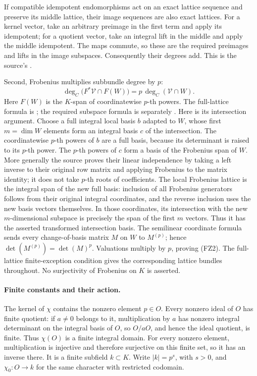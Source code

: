 If compatible idempotent endomorphisms act on an exact
lattice sequence and preserve its middle lattice, their
image sequences are also exact lattices.
For a kernel vector, take an arbitrary preimage in the
first term and apply its idempotent; for a quotient
vector, take an integral lift in the middle and apply
the middle idempotent.
The maps commute, so these are the required preimages
and lifts in the image subspaces.
Consequently their degrees add.
This is the source's
.

Second, Frobenius multiplies subbundle degree by \(p\):
\[
       \deg_C\bigl(F^*\mathcal V\cap F(W)\bigr)
                               =p\,\deg_C(\mathcal V\cap W).
 \tag{FZ2}\label{eq:faithful-frob-subdegree}
\]
Here \(F(W)\) is the \(K\)-span of coordinatewise
\(p\)-th powers.
The full-lattice formula is
; the required
subspace formula is separately
.
Here is its intersection argument.
Choose a full integral local basis \(b\) adapted to \(W\),
whose first \(m=\dim W\) elements form an integral
basis \(c\) of the intersection.
The coordinatewise \(p\)-th powers of \(b\) are a full
basis, because its determinant is raised to its
\(p\)-th power.
The \(p\)-th powers of \(c\) form a basis of the
Frobenius span of \(W\).
More generally the source proves their linear independence
by taking a left inverse to their original row matrix
and applying Frobenius to the matrix identity; it does
not take \(p\)-th roots of coefficients.
The local Frobenius lattice is the integral span of
the new full basis: inclusion of all Frobenius
generators follows from their original integral
coordinates, and the reverse inclusion uses the
new basis vectors themselves.
In those coordinates, its intersection with the
new \(m\)-dimensional subspace is precisely the span
of the first \(m\) vectors.
Thus it has the asserted transformed intersection basis.
The semilinear coordinate formula sends every
change-of-basis matrix \(M\) on \(W\) to \(M^{(p)}\);
hence \(\det(M^{(p)})=\det(M)^p\).
Valuations multiply by \(p\), proving (FZ2).
The full-lattice finite-exception condition gives the
corresponding lattice bundles throughout.
No surjectivity of Frobenius on \(K\) is asserted.

\paragraph{Finite constants and their action.}
The kernel of \(\chi\) contains the nonzero element
\(p\in O\).
Every nonzero ideal of \(O\) has finite quotient:
if \(a\ne0\) belongs to it, multiplication by \(a\)
has nonzero integral determinant on the integral basis
of \(O\), so \(O/aO\), and hence the ideal quotient,
is finite.
Thus \(\chi(O)\) is a finite integral domain.
For every nonzero element, multiplication is injective
and therefore surjective on this finite set, so it has
an inverse there.
It is a finite subfield \(k\subset K\).
Write \(|k|=p^s\), with \(s>0\), and
\(\chi_0:O\to k\) for the same character with restricted
codomain.


